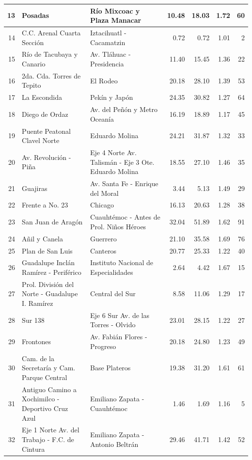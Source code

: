 {\begin{longtable}{|r|p{5.0cm}|p{5.0cm}|r|r|r|r|}
  \hline
  13 & Posadas & Río Mixcoac y Plaza Manacar & 10.48 & 18.03 & 1.72 & 60 \\
  \hline
  14 & C.C. Arenal Cuarta Sección & Iztacihuatl - Cacamatzin & 0.72 & 0.72 & 1.01 & 2 \\
  \hline
  15 & Río de Tacubaya y Canario & Av. Tláhuac - Presidencia & 11.40 & 15.45 & 1.36 & 22 \\
  \hline
  16 & 2da. Cda. Torres de Tepito & El Rodeo & 20.18 & 28.10 & 1.39 & 53 \\
  \hline
  17 & La Escondida & Pekín y Japón & 24.35 & 30.82 & 1.27 & 64 \\
  \hline
  18 & Diego de Ordaz & Av. del Peñón y Metro Oceanía & 16.19 & 18.89 & 1.17 & 45 \\
  \hline
  19 & Puente Peatonal Clavel Norte & Eduardo Molina & 24.21 & 31.87 & 1.32 & 33 \\
  \hline
  20 & Av. Revolución - Piña & Eje 4 Norte Av. Talismán - Eje 3 Ote. Eduardo Molina & 18.55 & 27.10 & 1.46 & 35 \\
  \hline
  21 & Guajiras & Av. Santa Fe - Enrique del Moral & 3.44 & 5.13 & 1.49 & 29 \\
  \hline
  22 & Frente a No. 23 & Chicago & 16.13 & 20.63 & 1.28 & 38 \\
  \hline
  23 & San Juan de Aragón & Cuauhtémoc - Antes de Prol. Niños Héroes & 32.04 & 51.89 & 1.62 & 91 \\
  \hline
  24 & Añil y Canela & Guerrero & 21.10 & 35.58 & 1.69 & 76 \\
  \hline
  25 & Plan de San Luis & Canteros & 20.77 & 25.33 & 1.22 & 40 \\
  \hline
  26 & Guadalupe Inclán Ramírez - Periférico & Instituto Nacional de Especialidades & 2.64 & 4.42 & 1.67 & 15 \\
  \hline
  27 & Prol. División del Norte - Guadalupe I. Ramírez & Central del Sur & 8.58 & 11.06 & 1.29 & 17 \\
  \hline
  28 & Sur 138 & Eje 6 Sur Av. de las Torres - Olvido & 23.01 & 28.15 & 1.22 & 27 \\
  \hline
  29 & Frontones & Av. Fabián Flores - Progreso & 20.18 & 24.80 & 1.23 & 49 \\
  \hline
  30 & Cam. de la Secretaría y Cam. Parque Central & Base Plateros & 19.38 & 31.20 & 1.61 & 61 \\
  \hline
  31 & Antiguo Camino a Xochimilco - Deportivo Cruz Azul & Emiliano Zapata - Cuauhtémoc & 1.46 & 1.69 & 1.16 & 5 \\
  \hline
  32 & Eje 1 Norte Av. del Trabajo - F.C. de Cintura & Emiliano Zapata - Antonio Beltrán & 29.46 & 41.71 & 1.42 & 52 \\

\end{longtable}}
